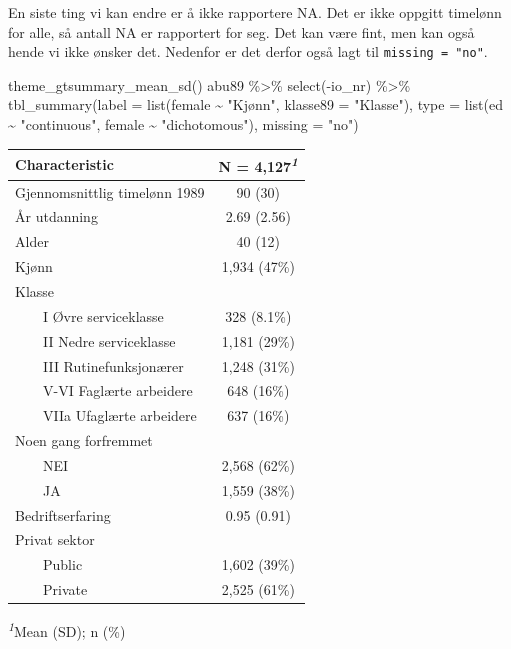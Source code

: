 \documentclass[
  norsk,
  letterpaper,
  DIV=11,
  numbers=noendperiod]{scrreprt}
\newenvironment{Shaded}{\begin{snugshade}}{\end{snugshade}}
\newcommand{\AttributeTok}[1]{\textcolor[rgb]{0.40,0.45,0.13}{#1}}
\newcommand{\FunctionTok}[1]{\textcolor[rgb]{0.28,0.35,0.67}{#1}}
\newcommand{\NormalTok}[1]{\textcolor[rgb]{0.00,0.23,0.31}{#1}}
\newcommand{\SpecialCharTok}[1]{\textcolor[rgb]{0.37,0.37,0.37}{#1}}
\newcommand{\StringTok}[1]{\textcolor[rgb]{0.13,0.47,0.30}{#1}}
\theoremstyle{definition}
\theoremstyle{remark}
\begin{document}
En siste ting vi kan endre er å ikke rapportere NA. Det er ikke oppgitt
timelønn for alle, så antall NA er rapportert for seg. Det kan være
fint, men kan også hende vi ikke ønsker det. Nedenfor er det derfor også
lagt til \texttt{missing\ =\ "no"}.

\begin{Shaded}
\begin{Highlighting}[]
\FunctionTok{theme\_gtsummary\_mean\_sd}\NormalTok{()}
\NormalTok{abu89 }\SpecialCharTok{\%\textgreater{}\%} 
  \FunctionTok{select}\NormalTok{(}\SpecialCharTok{{-}}\NormalTok{io\_nr) }\SpecialCharTok{\%\textgreater{}\%} 
  \FunctionTok{tbl\_summary}\NormalTok{(}\AttributeTok{label =} \FunctionTok{list}\NormalTok{(female }\SpecialCharTok{\textasciitilde{}} \StringTok{"Kjønn"}\NormalTok{, }\AttributeTok{klasse89 =} \StringTok{"Klasse"}\NormalTok{), }
              \AttributeTok{type =} \FunctionTok{list}\NormalTok{(ed }\SpecialCharTok{\textasciitilde{}} \StringTok{"continuous"}\NormalTok{, female }\SpecialCharTok{\textasciitilde{}} \StringTok{"dichotomous"}\NormalTok{), }
              \AttributeTok{missing =} \StringTok{"no"}\NormalTok{)}
\end{Highlighting}
\end{Shaded}

\begin{table}
\fontsize{12.0pt}{14.0pt}\selectfont
\begin{tabular*}{\linewidth}{@{\extracolsep{\fill}}lc}
\toprule
\textbf{Characteristic} & \textbf{N = 4,127}\textsuperscript{\textit{1}} \\ 
\midrule\addlinespace[2.5pt]
Gjennomsnittlig timelønn 1989 & 90 (30) \\ 
År utdanning & 2.69 (2.56) \\ 
Alder & 40 (12) \\ 
Kjønn & 1,934 (47\%) \\ 
Klasse &  \\ 
    I Øvre serviceklasse & 328 (8.1\%) \\ 
    II Nedre serviceklasse & 1,181 (29\%) \\ 
    III Rutinefunksjonærer & 1,248 (31\%) \\ 
    V-VI Faglærte arbeidere & 648 (16\%) \\ 
    VIIa Ufaglærte arbeidere & 637 (16\%) \\ 
Noen gang forfremmet &  \\ 
    NEI & 2,568 (62\%) \\ 
    JA & 1,559 (38\%) \\ 
Bedriftserfaring & 0.95 (0.91) \\ 
Privat sektor &  \\ 
    Public & 1,602 (39\%) \\ 
    Private & 2,525 (61\%) \\ 
\bottomrule
\end{tabular*}
\begin{minipage}{\linewidth}
\vspace{.05em}
\textsuperscript{\textit{1}}Mean (SD); n (\%)\\
\end{minipage}
\end{table}
\end{document}
